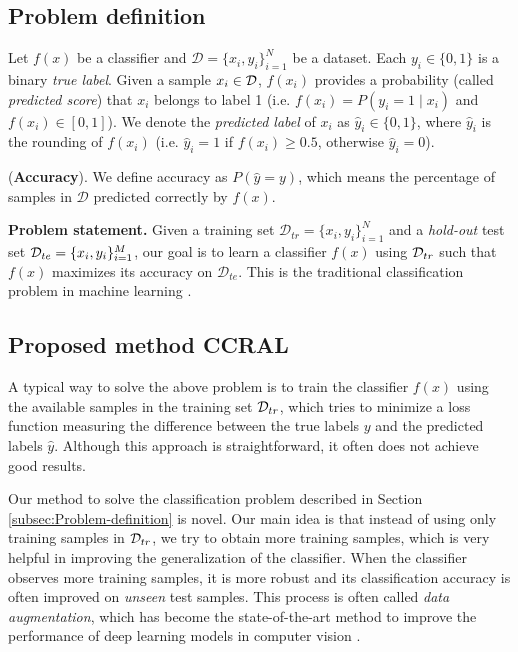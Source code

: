 
\subsection{Problem definition\label{subsec:Problem-definition}}

Let $f(x)$ be a classifier and $\mathcal{D}=\{x_{i},y_{i}\}_{i=1}^{N}$
be a dataset. Each $y_{i}\in\{0,1\}$ is a binary \textit{true label}.
Given a sample $x_{i}\in{\cal D}$, $f(x_{i})$ provides a probability
(called \textit{predicted score}) that $x_{i}$ belongs to label 1
(i.e. $f(x_{i})=P(y_{i}=1\mid x_{i})$ and $f(x_{i})\in[0,1]$). We
denote the \textit{predicted label} of $x_{i}$ as $\hat{y}_{i}\in\{0,1\}$,
where $\hat{y}_{i}$ is the rounding of $f(x_{i})$ (i.e. $\hat{y}_{i}=1$
if $f(x_{i})\geq0.5$, otherwise $\hat{y}_{i}=0$).
\begin{definition}
(\textbf{Accuracy}). We define accuracy as $P(\hat{y}=y)$, which
means the percentage of samples in $\mathcal{D}$ predicted correctly
by $f(x)$.
\end{definition}

\textbf{Problem statement.} Given a training set $\mathcal{D}_{tr}=\{x_{i},y_{i}\}_{i=1}^{N}$
and a \textit{hold-out} test set ${\cal D}_{te}=\{x_{i},y_{i}\}_{i=1}^{M}$,
our goal is to learn a classifier $f(x)$ using ${\cal D}_{tr}$ such
that $f(x)$ maximizes its accuracy on $\mathcal{D}_{te}$. This is
the traditional classification problem in machine learning \cite{bishop_06_pattern}.

\subsection{Proposed method CCRAL}

A typical way to solve the above problem is to train the classifier
$f(x)$ using the available samples in the training set ${\cal D}_{tr}$,
which tries to minimize a loss function measuring the difference between
the true labels $y$ and the predicted labels $\hat{y}$. Although
this approach is straightforward, it often does not achieve good results.

Our method to solve the classification problem described in Section
\ref{subsec:Problem-definition} is novel. Our main idea is that instead
of using only training samples in ${\cal D}_{tr}$, we try to obtain
more training samples, which is very helpful in improving the generalization
of the classifier. When the classifier observes more training samples,
it is more robust and its classification accuracy is often improved
on \textit{unseen} test samples. This process is often called \textit{data
augmentation}, which has become the state-of-the-art method to improve
the performance of deep learning models in computer vision \cite{shorten2019survey}.

